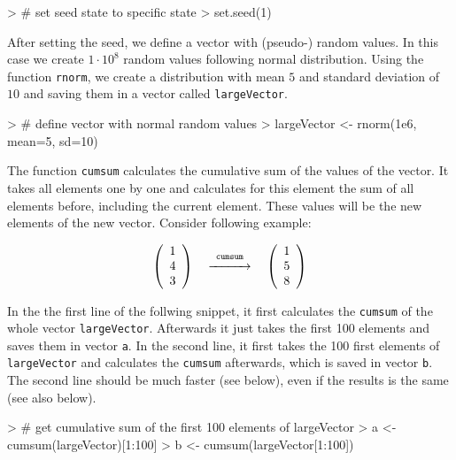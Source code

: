 \documentclass{article}
\begin{document}
\begin{Schunk}
\begin{Sinput}
> # set seed state to specific state
> set.seed(1)
\end{Sinput}
\end{Schunk}

After setting the seed, we define a vector with (pseudo-) random values. In this case we create $1 \cdot 10^8$ random values following normal distribution. Using the function \texttt{rnorm}, we create a distribution with mean $5$ and standard deviation of $10$ and saving them in a vector called \texttt{largeVector}.

\begin{Schunk}
\begin{Sinput}
> # define vector with normal random values
> largeVector <- rnorm(1e6, mean=5, sd=10)
\end{Sinput}
\end{Schunk}

The function \texttt{cumsum} calculates the cumulative sum of the values of the vector. It takes all elements one by one and calculates for this element the sum of all elements before, including the current element. These values will be the new elements of the new vector. Consider following example:

$$
\left(\begin{array}{ccc}1\\ 4\\ 3\end{array}\right) \quad \overset{\texttt{cumsum}}{\xrightarrow{\hspace*{1cm}}} \quad \left(\begin{array}{ccc}1\\ 5\\ 8\end{array}\right)
$$

In the the first line of the follwing snippet, it first calculates the \texttt{cumsum} of the whole vector \texttt{largeVector}. Afterwards it just takes the first 100 elements and saves them in vector \texttt{a}. In the second line, it first takes the 100 first elements of \texttt{largeVector} and calculates the \texttt{cumsum} afterwards, which is saved in vector \texttt{b}. The second line should be much faster (see below), even if the results is the same (see also below).

\begin{Schunk}
\begin{Sinput}
> # get cumulative sum of the first 100 elements of largeVector
> a <- cumsum(largeVector)[1:100]
> b <- cumsum(largeVector[1:100])
\end{Sinput}
\end{Schunk}
\end{document}
